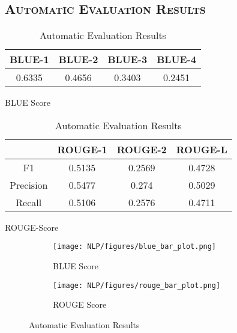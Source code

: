 \documentclass[a4paper,10pt]{article}
\begin{document}
\subsection{\scshape{Automatic Evaluation Results}}

\begin{table}[!htb]
    \begin{minipage}{.5\linewidth}
        \centering
        \begin{tabular}{|c|c|c|c|}
            \hline
            BLUE-1 & BLUE-2 & BLUE-3 & BLUE-4\\
            \hline
            0.6335 & 0.4656 & 0.3403 & 0.2451\\
            \hline
        \end{tabular}
        \caption{BLUE Score}
    \end{minipage}%
    \begin{minipage}{.5\linewidth}
        \centering
        \begin{tabular}{|c|c|c|c|}
            \hline
            & ROUGE-1 & ROUGE-2 & ROUGE-L\\
            \hline
            F1 & 0.5135 & 0.2569&	0.4728\\
            \hline
            Precision & 0.5477 &	0.274	& 0.5029\\
            \hline
            Recall & 0.5106 &	0.2576 &	0.4711\\
            \hline
        \end{tabular}
        \caption{ROUGE-Score}
    \end{minipage} 
    \caption{Automatic Evaluation Results}
\end{table}

\begin{figure}[!htb]
    \centering
    \begin{minipage}{.5\linewidth}
        \centering
        \begin{subfigure}[b]{\linewidth}
            \centering
            \texttt{[image: NLP/figures/blue\_bar\_plot.png]}
            \caption{BLUE Score}
        \end{subfigure}
    \end{minipage}%
    \begin{minipage}{.5\linewidth}
        \centering
        \begin{subfigure}[b]{\linewidth}
            \centering
            \texttt{[image: NLP/figures/rouge\_bar\_plot.png]}
            \caption{ROUGE Score}
        \end{subfigure}
    \end{minipage}
    \caption{Automatic Evaluation Results}
\end{figure}
\end{document}

